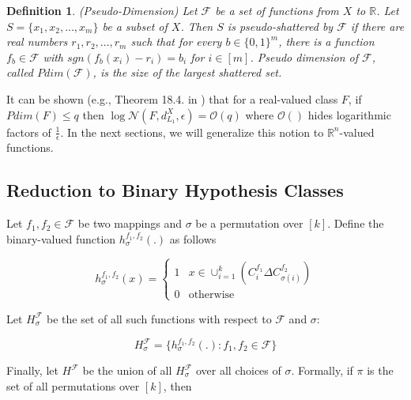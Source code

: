 \documentclass[letterpaper,12pt,titlepage,oneside,final]{book}
\newtheorem{definition}{Definition}
\begin{document}
\begin{definition} (Pseudo-Dimension)
Let $\mathcal{F}$ be a set of functions from $X$ to $\mathbb{R}$. Let $S=\{x_1,x_2,\ldots,x_m\}$ be a subset of $X$. Then $S$ is pseudo-shattered by $\mathcal{F}$ if there are real numbers $r_1,r_2,\ldots,r_m$ such that for every $b\in \{0,1\}^m$, there is a function $f_b\in \mathcal{F}$ with $sgn(f_b(x_i)-r_i)=b_i$ for $i\in[m]$. Pseudo dimension of $\mathcal{F}$, called $Pdim(\mathcal{F})$, is the size of the largest shattered set.

\end{definition}

It can be shown (e.g., Theorem 18.4. in \cite{anthony2009neural}) that for a real-valued class $F$, if $Pdim(F)\leq q$ then $\log \mathcal{N}(F, d_{L_1}^X,\epsilon) = \mathcal{O}(q)$ where $\mathcal{O}()$ hides logarithmic factors of $\frac{1}{\epsilon}$. In the next sections, we will generalize this notion to $\mathbb{R}^n$-valued functions.





\subsection{Reduction to Binary Hypothesis Classes}

Let $f_1,f_2\in\mathcal{F}$ be two mappings and $\sigma$ be a permutation over $[k]$. Define the binary-valued function $h_{\sigma}^{f_1,f_2}(.)$ as follows

\begin{equation}
h_{\sigma}^{f_1,f_2}(x) = \left\{
	\begin{array}{ll}
		1 & x\in \cup_{i=1}^{k} (C^{f_1}_i \Delta C^{f_2}_{\sigma(i)}) \\
		0 & \mbox{otherwise}
	\end{array}
\right.
\end{equation}

Let $H^{\mathcal{F}}_\sigma$ be the set of all such functions with respect to $\mathcal{F}$ and $\sigma$:

\begin{equation}
H^{\mathcal{F}}_\sigma = \{ h_{\sigma}^{f_1,f_2}(.):f_1,f_2\in \mathcal{F} \}
\end{equation}

Finally, let $H^{\mathcal{F}}$ be the union of all $H^{\mathcal{F}}_\sigma$ over all choices of $\sigma$. Formally, if $\pi$ is the set of all permutations over $[k]$, then
\end{document}

